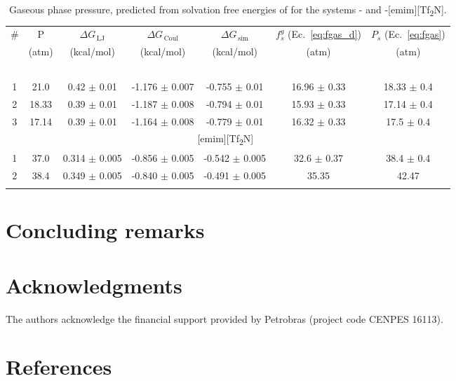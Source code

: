 \documentclass[3p,twocolumn]{elsarticle}
\begin{document}
\begin{table}
\centering
\begin{adjustbox}{width=1\textwidth}
\begin{threeparttable}
\caption{Gaseous phase pressure, predicted from solvation free energies of  for the systems -\ce{[emim][B(CN)_4]} and -[emim][Tf\textsubscript{2}N].}
\begin{tabular}{ c c  c  c  c  c c }  
\toprule
\# & P &$\Delta G_{\,\text{LJ}}$  & $\Delta G_{\,\text{Coul}}$  & $\Delta G_{\,\text{sim}}$ & $f^{g}_s$ (Ec.~\ref{eq:fgas_d}) & $P_s$ (Ec.~\ref{eq:fgas}) \\
 &(atm) & (kcal/mol) & (kcal/mol) &  (kcal/mol) & (atm) & (atm) \\
		\hline
		\multicolumn{7}{c}{\ce{[emim][B(CN)_4]}~\cite{Koller_2012} } \\
1 & 21.0 &  0.42 $\pm$ 0.01 & -1.176  $\pm$ 0.007  & -0.755 $\pm$ 0.01 & 16.96 $\pm$ 0.33 & 18.33 $\pm$ 0.4 \\
2 & 18.33 &  0.39 $\pm$ 0.01 & -1.187  $\pm$ 0.008  & -0.794 $\pm$ 0.01 & 15.93 $\pm$ 0.33 & 17.14 $\pm$ 0.4 \\ 
3 & 17.14 &  0.39 $\pm$ 0.01 & -1.164  $\pm$ 0.008  & -0.779 $\pm$ 0.01 & 16.32 $\pm$ 0.33 & 17.5 $\pm$ 0.4 \\
		\hline
       \multicolumn{7}{c}{[emim][Tf\textsubscript{2}N]~\cite{K_ddermann_2007} } \\
1 & 37.0 &  0.314 $\pm$ 0.005  & -0.856 $\pm$ 0.005 & -0.542 $\pm$ 0.005 & 32.6 $\pm$ 0.37 & 38.4 $\pm$ 0.4 \\
2 & 38.4 &  0.349 $\pm$ 0.005  & -0.840  $\pm$ 0.005 & -0.491 $\pm$ 0.005 & 35.35  & 42.47 \\
 \bottomrule
\label{table:deltaG_conc} 
\end{tabular}
\end{threeparttable}
\end{adjustbox}
\end{table}


\section{Concluding remarks}
\label{sec:conclusion}


\section*{Acknowledgments}
The authors acknowledge the financial support provided by Petrobras (project code CENPES 16113). 

\section*{References}


\end{document}
